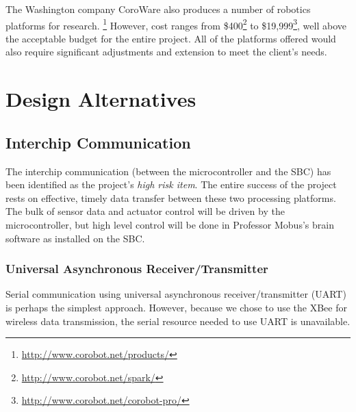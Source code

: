 \documentclass{article}
\begin{document}
    The Washington company CoroWare also produces
    a number of robotics platforms for research.%
    \footnote{\url{http://www.corobot.net/products/}}
    However, cost ranges from \$400\footnote{\url{http://www.corobot.net/spark/}}
    to \$19,999\footnote{\url{http://www.corobot.net/corobot-pro/}},
    well above the acceptable budget for the entire project.
    All of the platforms offered would also require significant adjustments
    and extension to meet the client's needs.
    

\FloatBarrier
\section{Design Alternatives} %
    \label{sec:design_alternatives}
    
    
    \subsection{Interchip Communication}
    
        The interchip communication
        (between the microcontroller and the SBC)
        has been identified as the project's \emph{high risk item}.
        The entire success of the project rests
        on effective, timely data transfer between these two
        processing platforms.
        The bulk of sensor data and actuator control
        will be driven by the microcontroller,
        but high level control will be done in
        Professor Mobus's brain software as installed on the SBC.
    
        \subsubsection{Universal Asynchronous Receiver/Transmitter}
        
            Serial communication using universal asynchronous receiver/transmitter
            (UART) is perhaps the simplest approach.
            However, because we chose to use the XBee for wireless data transmission,
            the serial resource needed to use UART is unavailable.
            
\end{document}

